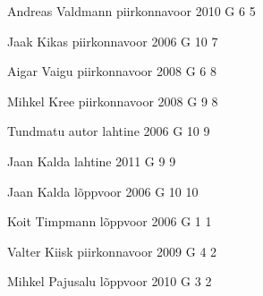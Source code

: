 \documentclass[11pt]{article}
\begin{document}
{Andreas Valdmann} %
{piirkonnavoor} %
{2010} %
{G 6} %
{5} %
{

\ifEngHint
\fi
}

{Jaak Kikas} %
{piirkonnavoor} %
{2006} %
{G 10} %
{7} %
{

\ifEngHint
\fi
}

{Aigar Vaigu} %
{piirkonnavoor} %
{2008} %
{G 6} %
{8} %
{

\ifEngHint
\fi
}

{Mihkel Kree} %
{piirkonnavoor} %
{2008} %
{G 9} %
{8} %
{

\ifEngHint
\fi
}

{Tundmatu autor} %
{lahtine} %
{2006} %
{G 10} %
{9} %
{

\ifEngHint
\fi
}

{Jaan Kalda} %
{lahtine} %
{2011} %
{G 9} %
{9} %
{

\ifEngHint
\fi
}

{Jaan Kalda} %
{lõppvoor} %
{2006} %
{G 10} %
{10} %
{

\ifEngHint
\fi
}

{Koit Timpmann} %
{lõppvoor} %
{2006} %
{G 1} %
{1} %
{

\ifEngHint
\fi
}

{Valter Kiisk} %
{piirkonnavoor} %
{2009} %
{G 4} %
{2} %
{

\ifEngHint
\fi
}

{Mihkel Pajusalu} %
{lõppvoor} %
{2010} %
{G 3} %
{2} %
{

\ifEngHint
\fi
}
\end{document}
